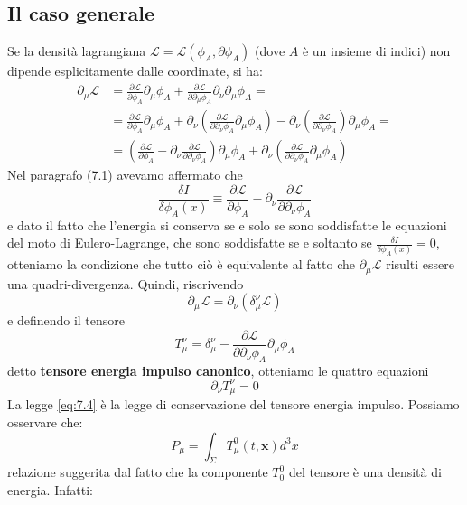 \documentclass[a4paper,11pt]{book}
\theoremstyle{plain}
\theoremstyle{definition}
\begin{document}
\subsection{Il caso generale}

Se la densità lagrangiana $\mathcal{L}=\mathcal{L}(\phi_{A}, \partial\phi_{A})$ (dove $A$ è un insieme di indici) non dipende esplicitamente dalle coordinate, si ha:
\begin{align*}
\partial_{\mu}\mathcal{L} &= \frac{\partial\mathcal{L}}{\partial\phi_A}\partial_{\mu}\phi_A+\frac{\partial\mathcal{L}}{\partial\partial_{\mu}\phi_A}\partial_{\nu}\partial_{\mu}\phi_A = \\
&= \frac{\partial\mathcal{L}}{\partial\phi_A}\partial_{\mu}\phi_A + \partial_{\nu}\left( \frac{\partial\mathcal{L}}{\partial\partial_{\nu}\phi_A}\partial_{\mu}\phi_A \right) - \partial_{\nu}\left( \frac{\partial\mathcal{L}}{\partial\partial_{\nu}\phi_A} \right)\partial_{\mu}\phi_A = \\
&= \left(\frac{\partial\mathcal{L}}{\partial\phi_A} -  \partial_{\nu} \frac{\partial\mathcal{L}}{\partial\partial_{\nu}\phi_A} \right)\partial_{\mu}\phi_A + \partial_{\nu}\left( \frac{\partial\mathcal{L}}{\partial\partial_{\nu}\phi_A}\partial_{\mu}\phi_A \right)
\end{align*}
Nel paragrafo (7.1) avevamo affermato che 
\[
\frac{\delta I}{\delta\phi_A(x)} \equiv \frac{\partial\mathcal{L}}{\partial\phi_A} -  \partial_{\nu} \frac{\partial\mathcal{L}}{\partial\partial_{\nu}\phi_A}
\]
e dato il fatto che l'energia si conserva se e solo se sono soddisfatte le equazioni del moto di Eulero-Lagrange, che sono soddisfatte se e soltanto se $\frac{\delta I}{\delta\phi_A(x)}=0$, otteniamo la condizione che tutto ciò è equivalente al fatto che $\partial_{\mu}\mathcal{L}$ risulti essere una quadri-divergenza. Quindi, riscrivendo 
\[
\partial_{\mu}\mathcal{L} = \partial_{\nu}(\delta_{\mu}^{\nu}\mathcal{L})
\]
e definendo il tensore
\begin{equation}
T_{\mu}^{\nu} = \delta_{\mu}^{\nu}-\frac{\partial\mathcal{L}}{\partial\partial_{\nu}\phi_A}\partial_{\mu}\phi_A
\end{equation}
detto \textbf{tensore energia impulso canonico}, otteniamo le quattro equazioni
\begin{equation}\label{eq:7.4}
\partial_{\nu}T_{\mu}^{\nu}=0
\end{equation}
La legge \eqref{eq:7.4} è la legge di conservazione del tensore energia impulso. Possiamo osservare che:
\[
P_{\mu} = \int_{\Sigma} T^0_{\mu}(t,\textbf{x})d^3x
\]
relazione suggerita dal fatto che la componente $T^0_0$ del tensore è una densità di energia. Infatti:
\end{document}
